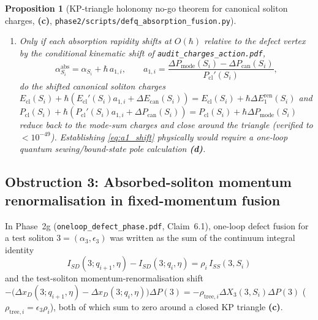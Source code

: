 \documentclass[11pt,a4paper]{article}
\newcommand{\Lc}{\textsf{\textbf{(c)}}}
\newcommand{\Ld}{\textsf{\textbf{(d)}}}
\newcommand{\hb}{\hbar}
\newcommand{\sfus}{\texttt{phase2/\allowbreak scripts/\allowbreak defq\_\allowbreak absorption\_\allowbreak fusion.py}}
\newtheorem{proposition}{Proposition}[section]
\theoremstyle{remark}
\begin{document}
\begin{proposition}[KP-triangle holonomy no-go theorem for canonical soliton charges, \Lc, \sfus]
\begin{enumerate}
boundary counterterms $\delta E_D^{\mathrm{ct}}(q_i),\delta P_D^{\mathrm{ct}}(q_i)$
are added at the defect---satisfies $\sum_{i=1}^3\big(Q_D^{\mathrm{quant}}(q_{i+1})-Q_D^{\mathrm{quant}}(q_i)\big) \equiv 0$,
\textbf{no boundary counterterm or defect state-charge assignment can balance
$(\Delta E_{\mathrm{can}}(S_i),\Delta P_{\mathrm{can}}(S_i))$ at the unshifted
classical absorption rapidities across all three edges of a KP triangle.}
\item Only if each absorption rapidity shifts at $O(\hb)$ relative to the defect
vertex by the conditional kinematic shift of
\texttt{audit\_charges\_action.pdf},
\begin{equation}\label{eq:a1_shift}
  \alpha_{S_i}^{\mathrm{abs}} = \alpha_{S_i} + \hb\,a_{1,i}, \qquad
  a_{1,i} = \frac{\Delta P_{\mathrm{mode}}(S_i) - \Delta P_{\mathrm{can}}(S_i)}{P_{\mathrm{cl}}'(S_i)},
\end{equation}
do the shifted canonical soliton charges
$E_{\mathrm{cl}}(S_i)+\hb(E_{\mathrm{cl}}'(S_i)a_{1,i}+\Delta E_{\mathrm{can}}(S_i)) = E_{\mathrm{cl}}(S_i)+\hb\Delta E_1^{\mathrm{ren}}(S_i)$
and $P_{\mathrm{cl}}(S_i)+\hb(P_{\mathrm{cl}}'(S_i)a_{1,i}+\Delta P_{\mathrm{can}}(S_i)) = P_{\mathrm{cl}}(S_i)+\hb\Delta P_{\mathrm{mode}}(S_i)$
reduce back to the mode-sum charges and close around the triangle (verified to
$<10^{-49}$). Establishing \eqref{eq:a1_shift} physically would require a
one-loop quantum sewing/bound-state pole calculation \Ld.
\end{enumerate}
\end{proposition}

\subsection{Obstruction 3: Absorbed-soliton momentum renormalisation in fixed-momentum fusion}

In Phase~2g (\texttt{oneloop\_defect\_phase.pdf}, Claim~6.1), one-loop defect
fusion for a test soliton $3 = (\alpha_3,\epsilon_3)$ was written as the sum of
the continuum integral identity
\begin{equation}\label{eq:ISD_fusion}
  I_{SD}(3;q_{i+1},\eta) - I_{SD}(3;q_i,\eta) = \rho_i\,I_{SS}(3,S_i)
\end{equation}
and the test-soliton momentum-renormalisation shift
$-\big(\Delta x_D(3;q_{i+1},\eta)-\Delta x_D(3;q_i,\eta)\big)\Delta P(3) = -\rho_{\mathrm{tree},i}\Delta X_3(3,S_i)\Delta P(3)$
($\rho_{\mathrm{tree},i} = \epsilon_3\rho_i$), both of which sum to zero around
a closed KP triangle \Lc.
\end{document}
